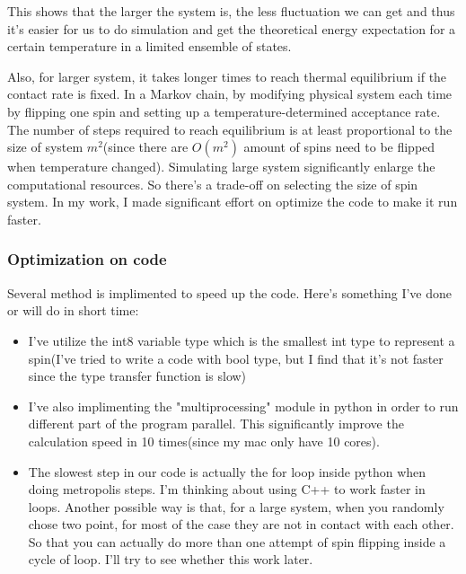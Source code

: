 \documentclass[11pt]{article}
\begin{document}



This shows that the larger the system is, the less fluctuation we can get and thus it's easier for us to do simulation and get the theoretical energy expectation for a certain temperature in a limited ensemble of states.

Also, for larger system, it takes longer times to reach thermal equilibrium if the contact rate is fixed. In a Markov chain, by modifying physical system each time by flipping one spin and setting up a temperature-determined acceptance rate. The number of steps required to reach equilibrium is at least proportional to the size of system $m^2$(since there are $O(m^2)$ amount of spins need to be flipped when temperature changed). Simulating large system significantly enlarge the computational resources. So there's a trade-off on selecting the size of spin system. In my work, I made significant effort on optimize the code to make it run faster.

\subsubsection{Optimization on code}

Several method is implimented to speed up the code. Here's something I've done or will do in short time:

\begin{itemize}
    \item I've utilize the int8 variable type which is the smallest int type to represent a spin(I've tried to write a code with bool type, but I find that it's not faster since the type transfer function is slow)
    \item I've also implimenting the "multiprocessing" module in python in order to run different part of the program parallel. This significantly improve the calculation speed in 10 times(since my mac only have 10 cores).
    \item The slowest step in our code is actually the for loop inside python when doing metropolis steps. I'm thinking about using C++ to work faster in loops. Another possible way is that, for a large system, when you randomly chose two point, for most of the case they are not in contact with each other. So that you can actually do more than one attempt of spin flipping inside a cycle of loop. I'll try to see whether this work later.
\end{itemize}
 
\end{document}
